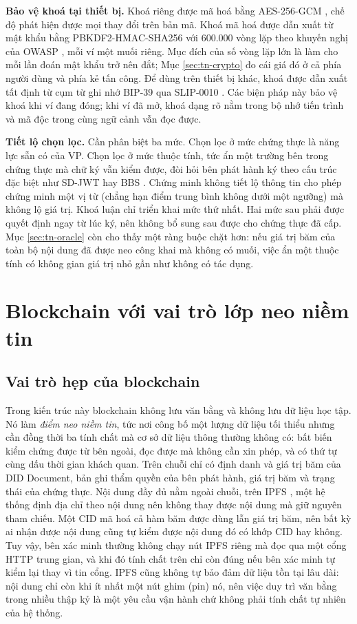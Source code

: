 \textbf{Bảo vệ khoá tại thiết bị.} Khoá riêng được mã hoá bằng AES-256-GCM \cite{NIST_SP800_38D}, chế độ phát hiện được mọi thay đổi trên bản mã. Khoá mã hoá được dẫn xuất từ mật khẩu bằng PBKDF2-HMAC-SHA256 \cite{NIST_SP800_132} với 600.000 vòng lặp theo khuyến nghị của OWASP \cite{OWASP_PasswordStorage}, mỗi ví một muối riêng. Mục đích của số vòng lặp lớn là làm cho mỗi lần đoán mật khẩu trở nên đắt; Mục \ref{sec:tn-crypto} đo cái giá đó ở cả phía người dùng và phía kẻ tấn công. Để dùng trên thiết bị khác, khoá được dẫn xuất tất định từ cụm từ ghi nhớ BIP-39 \cite{BIP39} qua SLIP-0010 \cite{SLIP0010}. Các biện pháp này bảo vệ khoá khi ví đang đóng; khi ví đã mở, khoá dạng rõ nằm trong bộ nhớ tiến trình và mã độc trong cùng ngữ cảnh vẫn đọc được.

\textbf{Tiết lộ chọn lọc.} Cần phân biệt ba mức. Chọn lọc ở mức chứng thực là năng lực sẵn có của VP. Chọn lọc ở mức thuộc tính, tức ẩn một trường bên trong chứng thực mà chữ ký vẫn kiểm được, đòi hỏi bên phát hành ký theo cấu trúc đặc biệt như SD-JWT \cite{RFC9901} hay BBS \cite{Looker_BBS2025}. Chứng minh không tiết lộ thông tin \cite{Goldwasser1989} cho phép chứng minh một vị từ (chẳng hạn điểm trung bình không dưới một ngưỡng) mà không lộ giá trị. Khoá luận chỉ triển khai mức thứ nhất. Hai mức sau phải được quyết định ngay từ lúc ký, nên không bổ sung sau được cho chứng thực đã cấp. Mục \ref{sec:tn-oracle} còn cho thấy một ràng buộc chặt hơn: nếu giá trị băm của toàn bộ nội dung đã được neo công khai mà không có muối, việc ẩn một thuộc tính có không gian giá trị nhỏ gần như không có tác dụng.

\section{Blockchain với vai trò lớp neo niềm tin}
\label{sec:blockchain}

\subsection{Vai trò hẹp của blockchain}

Trong kiến trúc này blockchain không lưu văn bằng và không lưu dữ liệu học tập. Nó làm \emph{điểm neo niềm tin}, tức nơi công bố một lượng dữ liệu tối thiểu nhưng cần đồng thời ba tính chất mà cơ sở dữ liệu thông thường không có: bất biến kiểm chứng được từ bên ngoài, đọc được mà không cần xin phép, và có thứ tự cùng dấu thời gian khách quan. Trên chuỗi chỉ có định danh và giá trị băm của DID Document, bản ghi thẩm quyền của bên phát hành, giá trị băm và trạng thái của chứng thực. Nội dung đầy đủ nằm ngoài chuỗi, trên IPFS \cite{Benet2014}, một hệ thống định địa chỉ theo nội dung nên không thay được nội dung mà giữ nguyên tham chiếu. Một CID mã hoá cả hàm băm được dùng lẫn giá trị băm, nên bất kỳ ai nhận được nội dung cũng tự kiểm được nội dung đó có khớp CID hay không. Tuy vậy, bên xác minh thường không chạy nút IPFS riêng mà đọc qua một cổng HTTP trung gian, và khi đó tính chất trên chỉ còn đúng nếu bên xác minh tự kiểm lại thay vì tin cổng. IPFS cũng không tự bảo đảm dữ liệu tồn tại lâu dài: nội dung chỉ còn khi ít nhất một nút ghim (pin) nó, nên việc duy trì văn bằng trong nhiều thập kỷ là một yêu cầu vận hành chứ không phải tính chất tự nhiên của hệ thống.


